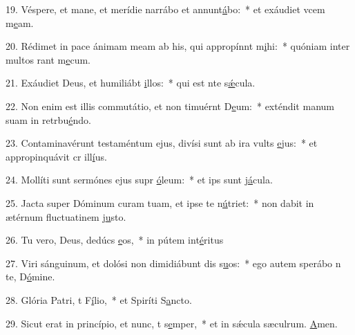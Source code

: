 19. Véspere, et mane, et merídie narrábo et annunt\uline{á}bo:~* et exáudiet vcem m\uline{e}am.\par 
20. Rédimet in pace ánimam meam ab his, qui appropínnt m\uline{i}hi:~* quóniam inter multos rant m\uline{e}cum.\par 
21. Exáudiet Deus, et humiliábt \uline{i}llos:~* qui est nte s\uline{ǽ}cula.\par 
22. Non enim est illis commutátio, et non timuérnt D\uline{e}um:~* exténdit manum suam in retrbu\uline{é}ndo.\par 
23. Contaminavérunt testaméntum ejus, divísi sunt ab ira vults \uline{e}jus:~* et appropinquávit cr ill\uline{í}us.\par 
24. Mollíti sunt sermónes ejus supr \uline{ó}leum:~* et ips sunt j\uline{á}cula.\par 
25. Jacta super Dóminum curam tuam, et ipse te n\uline{ú}triet:~* non dabit in ætérnum fluctuatinem j\uline{u}sto.\par 
26. Tu vero, Deus, dedúcs \uline{e}os,~* in pútem int\uline{é}ritus\par 
27. Viri sánguinum, et dolósi non dimidiábunt dis s\uline{u}os:~* ego autem sperábo n te, D\uline{ó}mine.\par 
28. Glória Patri, t F\uline{í}lio,~* et Spiríti S\uline{a}ncto.\par 
29. Sicut erat in princípio, et nunc, t s\uline{e}mper,~* et in sǽcula sæculrum. \uline{A}men.\par 
